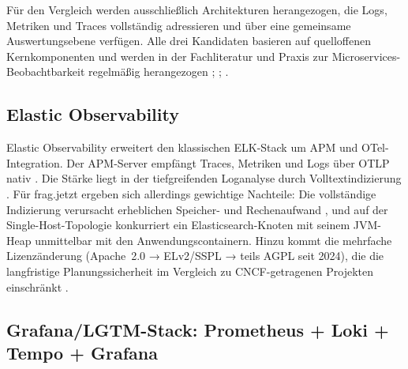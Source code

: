 Für den Vergleich werden ausschließlich Architekturen herangezogen, die Logs, Metriken und Traces vollständig adressieren und über eine gemeinsame Auswertungsebene verfügen. Alle drei Kandidaten basieren auf quelloffenen Kernkomponenten und werden in der Fachliteratur und Praxis zur Microservices-Beobachtbarkeit regelmäßig herangezogen \parencite[S.~72019--72021]{faseeha2025observability}; \parencite[S.~8]{tzanettis2022data}; \parencite[S.~1, 5]{giamattei2024monitoring}.


\subsection{Elastic Observability}

Elastic Observability erweitert den klassischen ELK-Stack um APM und OTel-Integration. Der APM-Server empfängt Traces, Metriken und Logs über OTLP nativ \parencite{elastic_otel_docs}. Die Stärke liegt in der tiefgreifenden Loganalyse durch Volltextindizierung \parencite[S.~920]{banerjee2025comparative}. Für frag.jetzt ergeben sich allerdings gewichtige Nachteile: Die vollständige Indizierung verursacht erheblichen Speicher- und Rechenaufwand \parencite[S.~918]{banerjee2025comparative}, und auf der Single-Host-Topologie konkurriert ein Elasticsearch-Knoten mit seinem JVM-Heap unmittelbar mit den Anwendungscontainern. Hinzu kommt die mehrfache Lizenzänderung (Apache~2.0 → ELv2/SSPL → teils AGPL seit 2024), die die langfristige Planungssicherheit im Vergleich zu CNCF-getragenen Projekten einschränkt \parencite{elastic_license_docs}.


\subsection{Grafana/LGTM-Stack: Prometheus + Loki + Tempo + Grafana}

